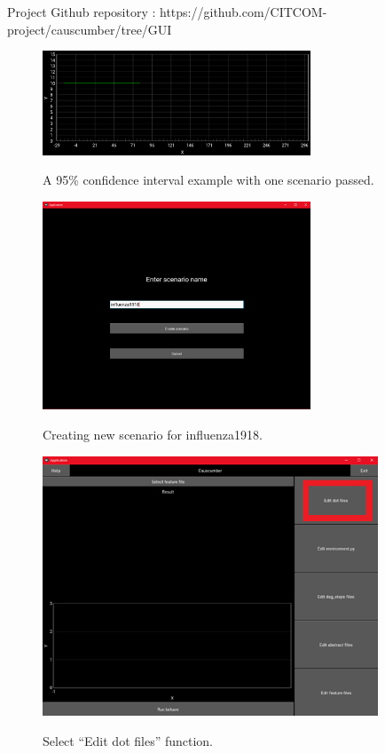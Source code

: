 Project Github repository : https://github.com/CITCOM-project/causcumber/tree/GUI 
\begin{figure}[H]
	\centering
	\includegraphics[width=8cm]{figures/95confidence_interval.png}\\
	\caption{A 95\% confidence interval example with one scenario passed.}
	\label{fig:figure40}
\end{figure}
\begin{figure}[H]
	\centering
	\includegraphics[width=8cm]{figures/influenzaTestProcess1.png}\\
	\caption{Creating new scenario for influenza1918.}
	\label{fig:figure19}
\end{figure}
\begin{figure}[H]
	\centering
	\includegraphics[width=10cm]{figures/influenzaTestProcess2.png}\\
	\caption{Select “Edit dot files” function.}
	\label{fig:figure20}
\end{figure}
